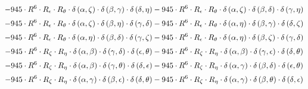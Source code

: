 \begin{subequations}
\begin{gather}
 \\[0.2em] \notag 		 - 945 \cdot R^{6} \cdot R_{\epsilon{}} \cdot R_{\theta{}} \cdot \delta{}\left(\alpha{}, \zeta{}\right) \cdot \delta{}\left(\beta{}, \gamma{}\right) \cdot \delta{}\left(\delta{}, \eta{}\right)- 945 \cdot R^{6} \cdot R_{\epsilon{}} \cdot R_{\theta{}} \cdot \delta{}\left(\alpha{}, \zeta{}\right) \cdot \delta{}\left(\beta{}, \delta{}\right) \cdot \delta{}\left(\gamma{}, \eta{}\right) 
 \\[0.2em] \notag 		 - 945 \cdot R^{6} \cdot R_{\epsilon{}} \cdot R_{\theta{}} \cdot \delta{}\left(\alpha{}, \zeta{}\right) \cdot \delta{}\left(\beta{}, \eta{}\right) \cdot \delta{}\left(\gamma{}, \delta{}\right)- 945 \cdot R^{6} \cdot R_{\epsilon{}} \cdot R_{\theta{}} \cdot \delta{}\left(\alpha{}, \eta{}\right) \cdot \delta{}\left(\beta{}, \gamma{}\right) \cdot \delta{}\left(\delta{}, \zeta{}\right) 
 \\[0.2em] \notag 		 - 945 \cdot R^{6} \cdot R_{\epsilon{}} \cdot R_{\theta{}} \cdot \delta{}\left(\alpha{}, \eta{}\right) \cdot \delta{}\left(\beta{}, \delta{}\right) \cdot \delta{}\left(\gamma{}, \zeta{}\right)- 945 \cdot R^{6} \cdot R_{\epsilon{}} \cdot R_{\theta{}} \cdot \delta{}\left(\alpha{}, \eta{}\right) \cdot \delta{}\left(\beta{}, \zeta{}\right) \cdot \delta{}\left(\gamma{}, \delta{}\right) 
 \\[0.2em] \notag 		 - 945 \cdot R^{6} \cdot R_{\zeta{}} \cdot R_{\eta{}} \cdot \delta{}\left(\alpha{}, \beta{}\right) \cdot \delta{}\left(\gamma{}, \delta{}\right) \cdot \delta{}\left(\epsilon{}, \theta{}\right)- 945 \cdot R^{6} \cdot R_{\zeta{}} \cdot R_{\eta{}} \cdot \delta{}\left(\alpha{}, \beta{}\right) \cdot \delta{}\left(\gamma{}, \epsilon{}\right) \cdot \delta{}\left(\delta{}, \theta{}\right) 
 \\[0.2em] \notag 		 - 945 \cdot R^{6} \cdot R_{\zeta{}} \cdot R_{\eta{}} \cdot \delta{}\left(\alpha{}, \beta{}\right) \cdot \delta{}\left(\gamma{}, \theta{}\right) \cdot \delta{}\left(\delta{}, \epsilon{}\right)- 945 \cdot R^{6} \cdot R_{\zeta{}} \cdot R_{\eta{}} \cdot \delta{}\left(\alpha{}, \gamma{}\right) \cdot \delta{}\left(\beta{}, \delta{}\right) \cdot \delta{}\left(\epsilon{}, \theta{}\right) 
 \\[0.2em] \notag 		 - 945 \cdot R^{6} \cdot R_{\zeta{}} \cdot R_{\eta{}} \cdot \delta{}\left(\alpha{}, \gamma{}\right) \cdot \delta{}\left(\beta{}, \epsilon{}\right) \cdot \delta{}\left(\delta{}, \theta{}\right)- 945 \cdot R^{6} \cdot R_{\zeta{}} \cdot R_{\eta{}} \cdot \delta{}\left(\alpha{}, \gamma{}\right) \cdot \delta{}\left(\beta{}, \theta{}\right) \cdot \delta{}\left(\delta{}, \epsilon{}\right) 

\end{gather}
\end{subequations}
